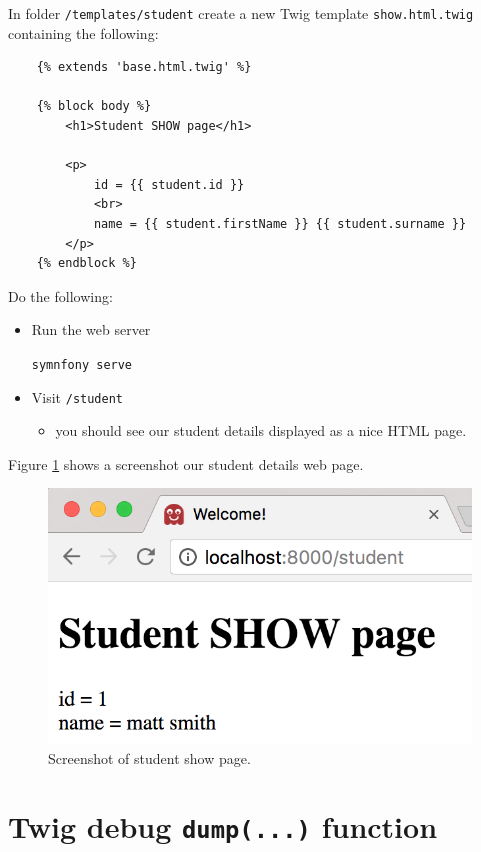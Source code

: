 \documentclass[a4paperpaper,openright]{book}
\providecommand{\tightlist}{%
  \setlength{\itemsep}{0pt}\setlength{\parskip}{0pt}}
\begin{document}
In folder \texttt{/templates/student} create a new Twig template
\texttt{show.html.twig} containing the following:

\begin{verbatim}
    {% extends 'base.html.twig' %}

    {% block body %}
        <h1>Student SHOW page</h1>

        <p>
            id = {{ student.id }}
            <br>
            name = {{ student.firstName }} {{ student.surname }}
        </p>
    {% endblock %}
\end{verbatim}

Do the following:

\begin{itemize}
\item
  Run the web server

  \texttt{symnfony\ serve}
\item
  Visit \texttt{/student}

  \begin{itemize}
  \tightlist
  \item
    you should see our student details displayed as a nice HTML page.
  \end{itemize}
\end{itemize}

Figure \ref{student_show} shows a screenshot our student details web
page.

\begin{figure}
\centering
\includegraphics{./tex2pdf.-65f13e14688ab55b/f0902fccf036efafb73d57fda9a541beba454125.png}
\caption{Screenshot of student show page. \label{student_show}}
\end{figure}

\hypertarget{twig-debug-dump...-function}{%
\section{\texorpdfstring{Twig debug \texttt{dump(...)}
function}{Twig debug dump(...) function}}\label{twig-debug-dump...-function}}
\end{document}
